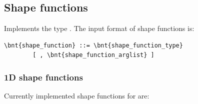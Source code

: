 \subsection{Shape functions}
\label{sec:shape function}
Implements the type .
The input format of shape functions is:
\begin{Verbatim}[commandchars=\\\{\}]
    \bnt{shape_function} ::= \bnt{shape_function_type}
        [ , \bnt{shape_function_arglist} ]
\end{Verbatim}
\subsubsection{1D shape functions}
\label{sec:shape function 1D}
Currently implemented shape functions for  are:
